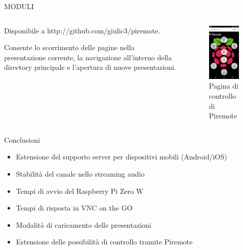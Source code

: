 \documentclass{beamer}
\begin{document}
\begin{frame}[fragile]{MODULI}

\begin{columns}[T]
    \begin{column}{.48\textwidth}
    Disponibile a http://github.com/giulic3/piremote.

    \vspace{1em}
    Consente lo scorrimento delle pagine nella presentazione corrente, la navigazione all'interno della directory principale e l'apertura di nuove presentazioni.

    \end{column}
    \begin{column}{.48\textwidth}
    \begin{figure}
        \includegraphics[scale=0.41]{img/main_page.jpg}
        \caption{Pagina di controllo di Piremote}
    \end{figure}
    \end{column}
\end{columns}
\end{frame}

\begin{frame}[fragile]{Conclusioni}
 \begin{itemize}
     \item Estensione del supporto server per dispositivi mobili (Android/iOS)
     \item Stabilità del canale nello streaming audio
     \item Tempi di avvio del Raspberry Pi Zero W
     \item Tempi di risposta in VNC on the GO
     \item Modalità di caricamento delle presentazioni
     \item Estensione delle possibilità di controllo tramite Piremote

 \end{itemize}
\end{frame}
\end{document}
